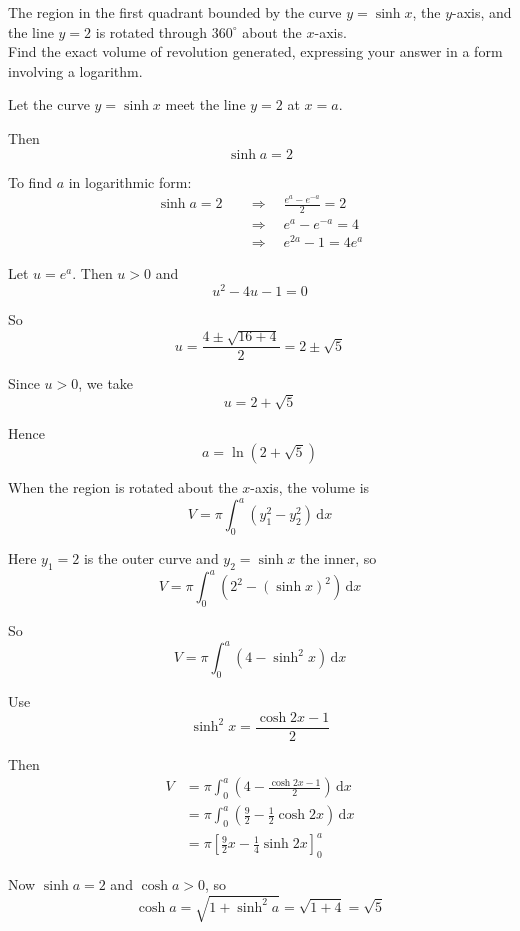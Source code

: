 \documentclass[leqno]{article}
\begin{document}
\begin{enumerate}[
  label=\textbf{\arabic*.},
  leftmargin=*,
  topsep=0pt,
  partopsep=0pt,
  parsep=0pt
]
\newpage

\questionitem

The region in the first quadrant bounded by the curve $y = \sinh x$, the $y$-axis, and the line $y = 2$ is rotated through $360^\circ$ about the $x$-axis. \\

Find the exact volume of revolution generated, expressing your answer in a form involving a logarithm. 

\vspace*{10pt}

\begin{djsSolution}
Let the curve $y=\sinh x$ meet the line $y=2$ at $x=a$.

Then
\[
\sinh a=2
\]

To find $a$ in logarithmic form:
\begin{align*}
\sinh a=2
&\quad\Longrightarrow\quad \frac{e^a-e^{-a}}{2}=2\\
&\quad\Longrightarrow\quad e^a-e^{-a}=4\\
&\quad\Longrightarrow\quad e^{2a}-1=4e^a
\end{align*}

Let $u=e^a$. Then $u>0$ and
\[
u^2-4u-1=0
\]

So
\[
u=\frac{4\pm\sqrt{16+4}}{2}=2\pm\sqrt{5}
\]

Since $u>0$, we take
\[
u=2+\sqrt5
\]

Hence
\[
a=\ln(2+\sqrt5)
\]

When the region is rotated about the $x$-axis, the volume is
\[
V=\pi\int_0^a \left(y_1^2-y_2^2\right)\,\mathrm{d}x
\]

Here $y_1=2$ is the outer curve and $y_2=\sinh x$ the inner, so
\[
V=\pi\int_0^a \left(2^2-(\sinh x)^2\right)\,\mathrm{d}x
\]

So
\[
V=\pi\int_0^a \left(4-\sinh^2 x\right)\,\mathrm{d}x
\]

Use
\[
\sinh^2 x=\frac{\cosh 2x-1}{2}
\]

Then
\begin{align*}
V
&=\pi\int_0^a \left(4-\frac{\cosh 2x-1}{2}\right)\,\mathrm{d}x\\
&=\pi\int_0^a \left(\frac92-\frac12\cosh 2x\right)\,\mathrm{d}x\\
&=\pi\left[\frac92x-\frac14\sinh 2x\right]_0^a
\end{align*}

Now $\sinh a=2$ and $\cosh a>0$, so
\[
\cosh a=\sqrt{1+\sinh^2 a}=\sqrt{1+4}=\sqrt5
\]


\end{djsSolution}
\end{enumerate}
\end{document}
